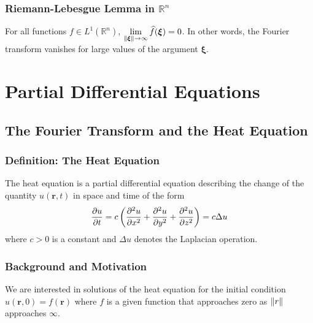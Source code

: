\documentclass[11pt, a4paper]{article}
\newcommand{\R}{\mathbb{R}} %
\begin{document}
\subsubsection{Riemann-Lebesgue Lemma in $ \R^n $}
For all functions $ f \in L^1(\R^n) $, $ \displaystyle{\lim_{\norm{\bm{\xi}} \to \infty} \widehat{f}(\bm{\xi}) = 0} $. In other words, the Fourier transform vanishes for large values of the argument $ \bm{\xi} $.

\newpage
\section{Partial Differential Equations}

\subsection{The Fourier Transform and the Heat Equation}

\subsubsection{Definition: The Heat Equation}
The heat equation is a partial differential equation describing the change of the quantity $ u(\bm{r}, t) $ in space and time of the form
\begin{equation*}
	\pdv{u}{t} = c \left(\pdv[2]{u}{x} + \pdv[2]{u}{y} + \pdv[2]{u}{z}\right) = c \Delta u
\end{equation*}
where $ c > 0 $ is a constant and $ \Delta u $ denotes the Laplacian operation.

\subsubsection{Background and Motivation}
We are interested in solutions of the heat equation for the initial condition $ u(\bm{r}, 0) = f(\bm{r}) $ where $ f $ is a given function that approaches zero as $ \norm{r} $ approaches $ \infty $. 
\end{document}

